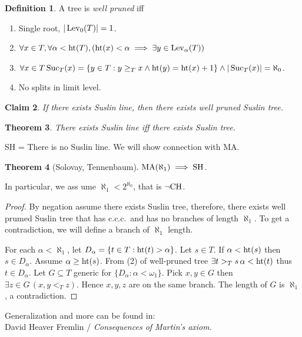 \documentclass[11pt,pdftex,twoside,a4paper]{article}
\newcommand{\MA}{\ensuremath{\mathop{\rm MA}\nolimits}}
\newcommand{\ccc}{c.c.c.}
\newcommand{\Lev}{\ensuremath{\mathop{\rm Lev}\nolimits}}
\newcommand{\SH}{\ensuremath{\mathop{\rm SH}\nolimits}}
\newcommand{\Suc}{\ensuremath{\mathop{\rm Suc}\nolimits}}
\newcommand{\tht}{\ensuremath{\mathop{\rm ht}\nolimits}}
\newtheorem{thm}{Theorem}[section]
\newtheorem{claim}[thm]{Claim}
\theoremstyle{definition}
\newtheorem{ldef}[thm]{Definition}
\begin{document}
{\begin{ldef}
A tree  is \emph{well pruned} iff
\begin{enumerate}
\item Single root, \(|\Lev_0(T)|=1\).
\item  \(\forall x\in T, \forall \alpha < \tht(T), 
  \left(\tht(x) < \alpha \implies \exists y\in \Lev_\alpha(T)\right)\)
\item \(\forall x\in T 
  \Suc_T(x) = \{y\in T: y\geq_T x \land \tht(y)=\tht(x) + 1\}
  \land |\Suc_T(x)|=\aleph_0\).
\item No splits in limit level.
\end{enumerate}
\end{ldef}

\begin{claim}
 If there exists Suslin line, then there exists well pruned Suslin tree.
\end{claim}

\begin{thm}
There exists Suslin line iff there exists Suslin tree.
\end{thm}

SH = There is no Suslin line.
We will show connection with MA.

\begin{thm}[Solovay, Tennenbaum]
\(\MA(\aleph_1) \implies \SH\).
\end{thm}
In particular, we ass ume \(\aleph_1 < 2^{\aleph_0}\), 
that is \(\lnot \textnormal{CH}\).
\begin{proof}
By negation assume there exists Suslin tree, therefore, there
exists well prumed Suslin tree 
that has \ccc\ and has no branches of length \(\aleph_1\).
To get a contradiction, we will define a branch of \(\aleph_1\) length.

For each \(\alpha<\aleph_1\), let \(D_\alpha = \{t\in T: \tht(t)>\alpha\}\).
Let \(s\in T\). If \(\alpha<\tht(s)\) then \(s\in D_\alpha\).
Assume \(\alpha \geq \tht(s)\). From (2) of well-pruned tree
\(\exists t >_T s\, \alpha < \tht(t)\)
thus \(t\in D_\alpha\).
Let \(G\subseteq T\) generic for \(\{D_\alpha: \alpha<\omega_1\}\).
Pick \(x,y\in G\) then \(\exists z\in G\, (x,y<_T z)\).
Hence \(x,y,z\) are on the same branch.
The length of $G$ is \(\aleph_1\), a contradiction.
\end{proof}

Generalization and more can be found in:\\
David Heaver Fremlin / \emph{Consequences of Martin's axiom}.

}
\end{document}

